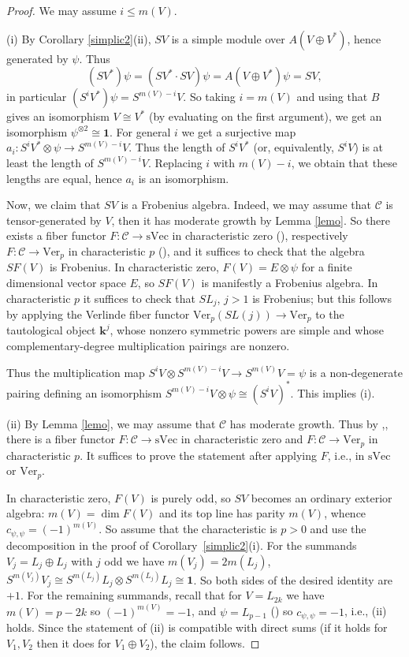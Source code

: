\documentclass[12pt]{amsart}
\numberwithin{equation}{section}
\providecommand{\k}{}\renewcommand{\k}{\mathbf{k}}
\providecommand{\C}{}\renewcommand{\C}{\mathcal{C}}
\providecommand{\sVec}{}\renewcommand{\sVec}{\mathrm{sVec}}
\providecommand{\Ver}{}\renewcommand{\Ver}{\mathrm{Ver}}
\theoremstyle{plain}
\theoremstyle{definition}
\theoremstyle{remark}
\begin{document}
\begin{proof} We may assume $i\le m(V)$. 

(i) By Corollary \ref{simplic2}(ii), $SV$ is a simple module over $A(V\oplus V^*)$, hence generated by $\psi$. Thus
$$
(SV^*)\psi=(SV^*\cdot SV)\psi=A(V\oplus V^*)\psi=SV,
$$
in particular $(S^iV^*)\psi=S^{m(V)-i}V$. 
 So taking $i=m(V)$ and using that $B$ gives an isomorphism 
$V\cong V^*$ (by evaluating on the first argument), we get an isomorphism $\psi^{\otimes 2}\cong \mathbf 1$. 
For general $i$ we get a surjective map $a_i: S^iV^*\otimes \psi\to S^{m(V)-i}V$. Thus the length 
of $S^iV^*$ (or, equivalently, $S^iV$) is at least the length of $S^{m(V)-i}V$. Replacing $i$ with $m(V)-i$, we obtain that 
these lengths are equal, hence $a_i$ is an isomorphism. 

Now, we claim that $SV$ is a Frobenius algebra. Indeed, we may assume that $\C$ is tensor-generated by $V$, then it has moderate growth by Lemma \ref{lemo}. So there exists a fiber functor $F: \C\to \sVec$  in characteristic zero (\cite{De}), respectively $F: \C\to \Ver_p$  in characteristic $p$ (\cite{CEO}), and it suffices to check that the algebra $SF(V)$ is Frobenius. In characteristic zero, 
$F(V)=E\otimes \psi$ for a finite dimensional vector space $E$, so $SF(V)$ is manifestly a Frobenius algebra. In characteristic $p$ 
it suffices to check that $SL_j$, $j>1$ is Frobenius; but this follows by applying the Verlinde fiber functor
$\Ver_p(SL(j))\to\Ver_p$ to the tautological object $\k^j$, whose
nonzero symmetric powers are simple and whose complementary-degree
multiplication pairings are nonzero.

Thus the multiplication map $S^iV\otimes S^{m(V)-i}V\to S^{m(V)}V=\psi$ is a non-degenerate pairing defining an isomorphism $S^{m(V)-i}V\otimes \psi\cong (S^iV)^*$. This implies (i).

(ii) By Lemma \ref{lemo}, we may assume that $\C$ has moderate growth. Thus 
by \cite{De},\cite{CEO}, there is a fiber functor $F: \C\to \sVec$ in characteristic zero and $F: \C\to \Ver_p$ 
in characteristic $p$. It suffices to prove the statement after applying $F$, i.e., in $\sVec$ or $\Ver_p$. 

In characteristic zero, $F(V)$ is purely odd, so $SV$ becomes an ordinary exterior algebra: $m(V)=\dim F(V)$ and its top line has parity $m(V)$, whence $c_{\psi,\psi}=(-1)^{m(V)}$. So assume that the characteristic is $p>0$ and use the decomposition in the proof of Corollary~\ref{simplic2}(i). For the summands $V_j=L_j\oplus L_j$ with $j$ odd we have 
$m(V_j)=2m(L_j)$, $S^{m(V_j)}V_j\cong S^{m(L_j)}L_j\otimes S^{m(L_j)}L_j\cong\mathbf1$. 
So both sides of the desired identity are $+1$.
For the remaining summands, recall that for $V=L_{2k}$ we have $m(V)=p-2k$ so $(-1)^{m(V)}=-1$, and $\psi=L_{p-1}$ (\cite{EOV}) so $c_{\psi,\psi}=-1$, i.e., (ii) holds. Since the statement of (ii) is compatible with direct sums (if it holds for $V_1,V_2$ then it does for $V_1\oplus V_2$), the claim follows.
\end{proof}
\end{document}
